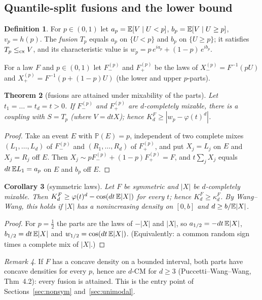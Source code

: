 \documentclass[11pt]{amsart}
\newtheorem{theorem}{Theorem}[section]\newtheorem{proposition}[theorem]{Proposition}\newtheorem{lemma}[theorem]{Lemma}
\newtheorem{corollary}[theorem]{Corollary}\newtheorem{conjecture}[theorem]{Conjecture}
\theoremstyle{definition}\newtheorem{definition}[theorem]{Definition}\theoremstyle{remark}\newtheorem{remark}[theorem]{Remark}
\begin{document}
\subsection{Quantile-split fusions and the lower bound}
\begin{definition}\label{def:fusion}
For $p\in(0,1)$ let $a_p=\mathbb E[V\mid U<p]$, $b_p=\mathbb E[V\mid U\ge p]$, $v_p=h(p)$. The \emph{fusion} $T_p$ equals $a_p$ on $\{U<p\}$ and $b_p$ on $\{U\ge p\}$; it satisfies
$T_p\le_{\mathrm{cx}} V$, and its characteristic value is $w_p=p\,e^{ia_p}+(1-p)\,e^{ib_p}$.
\end{definition}
For a law $F$ and $p\in(0,1)$ let $F_-^{(p)}$ and $F_+^{(p)}$ be the laws of $X_-^{(p)}=F^{-1}(pU)$ and $X_+^{(p)}=F^{-1}(p+(1-p)U)$ (the lower and upper $p$-parts).
\begin{theorem}[fusions are attained under mixability of the parts]\label{thm:fusion-lb}
Let $t_1=\dots=t_d=t>0$. If $F_-^{(p)}$ and $F_+^{(p)}$ are $d$-completely mixable, there is a coupling with $S=T_p$ (where $V=dtX$); hence
$K_d^F\ge|w_p-\varphi(t)^d|$.
\end{theorem}
\begin{proof}Take an event $E$ with $\mathbb P(E)=p$, independent of two complete mixes $(L_1,\dots,L_d)$ of $F_-^{(p)}$ and $(R_1,\dots,R_d)$ of $F_+^{(p)}$, and put
$X_j=L_j$ on $E$ and $X_j=R_j$ off $E$. Then $X_j\sim pF_-^{(p)}+(1-p)F_+^{(p)}=F$, and $t\sum_jX_j$ equals $dt\,\mathbb E L_1=a_p$ on $E$ and $b_p$ off $E$.\end{proof}
\begin{corollary}[symmetric laws]\label{cor:sym-lb}
Let $F$ be symmetric and $|X|$ be $d$-completely mixable. Then $K_d^F\ge\varphi(t)^d-\cos(dt\,\mathbb E|X|)$ for every $t$; hence $K_d^F\ge\kappa_d^F$. By
Wang--Wang, this holds if $|X|$ has a nonincreasing density on $[0,b]$ and $d\ge b/\mathbb E|X|$.
\end{corollary}
\begin{proof}For $p=\frac12$ the parts are the laws of $-|X|$ and $|X|$, so $a_{1/2}=-dt\,\mathbb E|X|$, $b_{1/2}=dt\,\mathbb E|X|$ and $w_{1/2}=\cos(dt\,\mathbb E|X|)$. (Equivalently:
a common random sign times a complete mix of $|X|$.)\end{proof}
\begin{remark}If $F$ has a concave density on a bounded interval, both parts have concave densities for every $p$, hence are $d$-CM for $d\ge3$
(Puccetti--Wang--Wang, Thm~4.2): every fusion is attained. This is the entry point of Sections~\ref{sec:nonsym} and~\ref{sec:unimodal}.
\end{remark}
\end{document}
